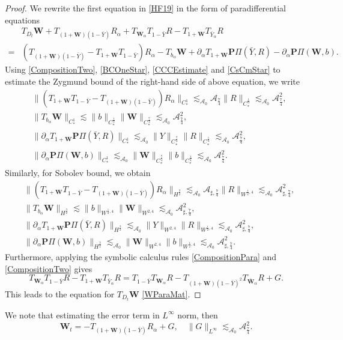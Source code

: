 \documentclass[10pt]{amsart}
\theoremstyle{remark}
\theoremstyle{definition}
\numberwithin{equation}{section}
\newcommand{\f}{\frac}
\newcommand{\bw}{\mathbf{W}}
\newcommand{\nP}{{\mathbf P}}
\newcommand{\CalAZ}{{\mathcal{A}_0}}
\newcommand{\ASSharp}{{\mathcal{A}_{\sharp,\frac{7}{4}}^2}}
\begin{document}
\begin{proof}
We rewrite the first equation in \eqref{HF19} in the form of paradifferential equations 
\begin{align*}
&T_{D_t}\bw + T_{(1+\bw)(1-\bar{Y})} R_\alpha + T_{\bw_\alpha}T_{1-\bar{Y}}R -T_{1+\bw}T_{\bar{Y}_\alpha}R\\
=&  \left(T_{(1+\bw)(1-\bar{Y})}-T_{1+\bw}T_{1-\bar{Y}}\right)R_\alpha 
  -T_{b_\alpha}\bw   + \partial_\alpha T_{1+\bw}\nP\Pi(\bar{Y}, R)-\partial_\alpha\nP\Pi(\bw, b).
\end{align*}
Using \eqref{CompositionTwo}, \eqref{BCOneStar}, \eqref{CCCEstimate} and \eqref{CsCmStar} to estimate the Zygmund bound of the right-hand side of above equation, we write
\begin{align*}
&\| (T_{1+\bw}T_{1-\bar{Y}}-T_{(1+\bw)(1-\bar{Y})})R_\alpha \|_{C_{*}^1} \lesssim_\CalAZ \mathcal{A}_\f74 \|R\|_{C_{*}^{\f14}}  \lesssim_\CalAZ \mathcal{A}^2_\f74, \\
& \|T_{b_\alpha}\bw \|_{C_{*}^1}\lesssim \|b\|_{C^{\f14}_{*}}\| \bw\|_{C_{*}^{\f74}}  \lesssim_\CalAZ \mathcal{A}^2_\f74, \\
& \|\partial_\alpha T_{1+\bw}\nP\Pi(\bar{Y}, R) \|_{C_{*}^1}\lesssim_\CalAZ \|Y\|_{C^{\f74}_*}\|R\|_{C^\f14_*}\lesssim_\CalAZ \mathcal{A}^2_\f74, \\
&\|\partial_\alpha\nP\Pi(\bw, b) \|_{C_{*}^1}\lesssim_\CalAZ \|\bw\|_{C^{\f74}_*}\|b\|_{C^\f14_*}\lesssim_\CalAZ \mathcal{A}^2_\f74.
\end{align*}
Similarly, for Sobolev bound, we obtain
\begin{align*}
&\| (T_{1+\bw}T_{1-\bar{Y}}-T_{(1+\bw)(1-\bar{Y})})R_\alpha \|_{H^\f32} \lesssim_\CalAZ \mathcal{A}_{\sharp,\f74} \|R\|_{W^{\f12,4}}  \lesssim_\CalAZ \ASSharp, \\
& \|T_{b_\alpha}\bw \|_{H^\f32}\lesssim \|b\|_{W^{\f12,4}}\| \bw\|_{W^{2,4}}  \lesssim_\CalAZ \ASSharp, \\
& \|\partial_\alpha T_{1+\bw}\nP\Pi(\bar{Y}, R) \|_{H^\f32}\lesssim_\CalAZ \|Y\|_{W^{2,4}}\|R\|_{W^{\f12,4}}\lesssim_\CalAZ \ASSharp, \\
&\|\partial_\alpha\nP\Pi(\bw, b) \|_{H^\f32}\lesssim_\CalAZ \|\bw\|_{W^{2,4}}\|b\|_{W^{\f12,4}}\lesssim_\CalAZ \ASSharp.
\end{align*}
Furthermore, applying the symbolic calculus rules \eqref{CompositionPara} and \eqref{CompositionTwo} gives
\begin{equation*}
T_{\bw_\alpha}T_{1-\bar{Y}}R -T_{1+\bw}T_{\bar{Y}_\alpha}R =  T_{1-\bar{Y}}T_{\bw_\alpha}R -T_{(1+\bw)(1-\bar{Y})^2}T_{\bar{\bw}_\alpha}R + G.
\end{equation*}
This leads to the equation for $T_{D_t}\bw$ \eqref{WParaMat}.
\end{proof}
We note that estimating the error term in $L^\infty$ norm, then
\begin{equation*}
    \bw_t = - T_{(1+\bw)(1-\bar{Y})}R_\alpha + G, \quad \|G\|_{L^\infty} \lesssim_\CalAZ \mathcal{A}^2_\f74.
\end{equation*}
\end{document}
